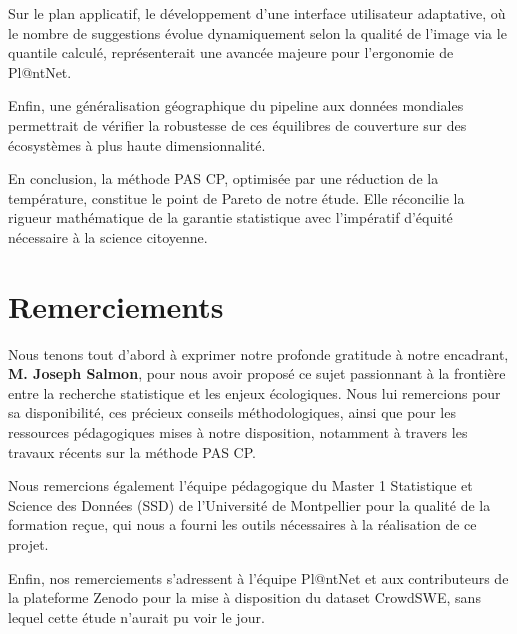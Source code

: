 \documentclass[12pt,a4paper]{article}
\begin{document}
Sur le plan applicatif, le développement d'une interface utilisateur adaptative, où le nombre de suggestions évolue dynamiquement selon la qualité de l'image via le quantile calculé, représenterait une avancée majeure pour l'ergonomie de Pl@ntNet.

Enfin, une généralisation géographique du pipeline aux données mondiales permettrait de vérifier la robustesse de ces équilibres de couverture sur des écosystèmes à plus haute dimensionnalité.

En conclusion, la méthode PAS CP, optimisée par une réduction de la température, constitue le \og point de Pareto \fg{} de notre étude. Elle réconcilie la rigueur mathématique de la garantie statistique avec l'impératif d'équité nécessaire à la science citoyenne.




\section{Remerciements}

Nous tenons tout d'abord à exprimer notre profonde gratitude à notre encadrant, \textbf{M. Joseph Salmon}, pour nous avoir proposé ce sujet passionnant à la frontière entre la recherche statistique et les enjeux écologiques. Nous lui remercions pour sa disponibilité, ces précieux conseils méthodologiques, ainsi que pour les ressources pédagogiques mises à notre disposition, notamment à travers les travaux récents sur la méthode PAS CP.

Nous remercions également l'équipe pédagogique du Master 1 Statistique et Science des Données (SSD) de l'Université de Montpellier pour la qualité de la formation reçue, qui nous a fourni les outils nécessaires à la réalisation de ce projet.

Enfin, nos remerciements s'adressent à l'équipe Pl@ntNet et aux contributeurs de la plateforme Zenodo pour la mise à disposition du dataset CrowdSWE, sans lequel cette étude n'aurait pu voir le jour.
\end{document}
